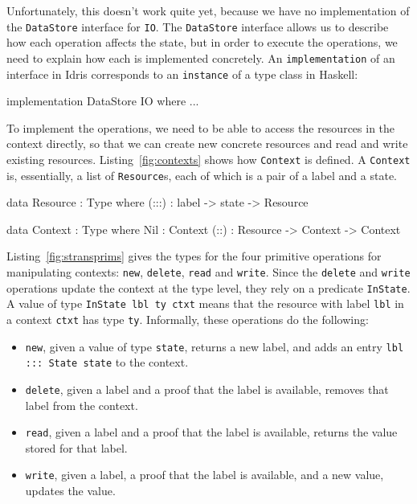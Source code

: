 Unfortunately, this doesn't work quite yet, because we have no implementation
of the \texttt{DataStore} interface for \texttt{IO}.
The \texttt{DataStore} interface allows us to describe how each operation
affects the state, but in order to execute the operations, we need to
explain how each is implemented concretely. An \texttt{implementation} of
an interface in Idris corresponds to an \texttt{instance} of a type class
in Haskell:

\small
\begin{code}
implementation DataStore IO where
  ...
\end{code}
\normalsize

To implement the operations, we need to be able to access the resources in
the context directly, so that we can create new concrete resources and read
and write existing resources. Listing~\ref{fig:contexts} shows how
\texttt{Context} is defined. A \texttt{Context} is, essentially, a list of
\texttt{Resource}s, each of which is a pair of a label and a state.

\small
\begin{code}[float=h, frame=single,caption={Resources, contexts and context membership},
label=fig:contexts]
data Resource : Type where
     (:::) : label -> state -> Resource

data Context : Type where
     Nil : Context
     (::) : Resource -> Context -> Context
\end{code}
\normalsize

Listing~\ref{fig:stransprims} gives the types for the four primitive
operations for manipulating contexts: \texttt{new}, \texttt{delete},
\texttt{read} and \texttt{write}. Since the \texttt{delete} and \texttt{write}
operations update the context at the type level, they rely on a 
predicate \texttt{InState}. A value of type \texttt{InState lbl ty ctxt}
means that the resource with label \texttt{lbl} in a context \texttt{ctxt}
has type \texttt{ty}. Informally, these operations do the following:

\begin{itemize}
\item \texttt{new}, given a value of type \texttt{state}, 
returns a new label, and adds an entry \texttt{lbl ::: State state} to
the context. 

\item \texttt{delete}, given a label and a proof that the label is available,
removes that label from the context.

\item \texttt{read}, given a label and a proof that the label is available,
returns the value stored for that label.

\item \texttt{write}, given a label, a proof that the label is available,
and a new value, updates the value.
\end{itemize}

